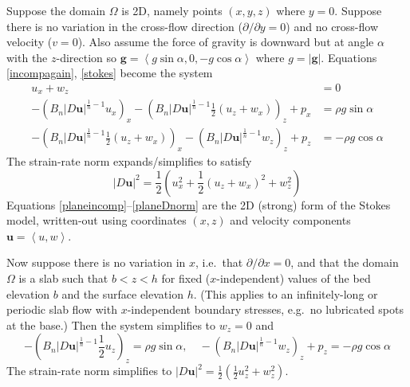 \documentclass[letterpaper,final,12pt,reqno]{amsart}
\newcommand{\bg}{\mathbf{g}}
\newcommand{\bu}{\mathbf{u}}
\begin{document}
Suppose the domain $\Omega$ is 2D, namely points $(x,y,z)$ where $y=0$.  Suppose there is no variation in the cross-flow direction ($\partial/\partial y=0$) and no cross-flow velocity ($v=0$).  Also assume the force of gravity is downward but at angle $\alpha$ with the $z$-direction so $\bg = \left<g\sin\alpha,0,-g\cos\alpha\right>$ where $g=|\bg|$.  Equations \eqref{incompagain}, \eqref{stokes} become the system
\begin{align}
u_x + w_z &= 0 \label{planeincomp} \\
- \left(B_n |D\bu|^{\frac{1}{n}-1} u_x\right)_x - \left(B_n |D\bu|^{\frac{1}{n}-1} \frac{1}{2} \left(u_z+w_x\right)\right)_z + p_x &= \rho g\sin\alpha \label{planestressx} \\
- \left(B_n |D\bu|^{\frac{1}{n}-1} \frac{1}{2} \left(u_z+w_x\right)\right)_x - \left(B_n |D\bu|^{\frac{1}{n}-1} w_z\right)_z + p_z &= -\rho g\cos\alpha \label{planestressz}
\end{align}
The strain-rate norm expands/simplifies to satisfy
\begin{equation}
    |D\bu|^2 = \frac{1}{2} \left(u_x^2 + \frac{1}{2}(u_z+w_x)^2 + w_z^2\right)  \label{planeDnorm}
\end{equation}
Equations \eqref{planeincomp}--\eqref{planeDnorm} are the 2D (strong) form of the Stokes model, written-out using coordinates $(x,z)$ and velocity components $\bu=\left<u,w\right>$.

Now suppose there is no variation in $x$, i.e.~that $\partial/\partial x=0$, and that the domain $\Omega$ is a slab such that $b < z < h$ for fixed ($x$-independent) values of the bed elevation $b$ and the surface elevation $h$.  (This applies to an infinitely-long or periodic slab flow with $x$-independent boundary stresses, e.g.~no lubricated spots at the base.)  Then the system simplifies to $w_z=0$ and
\begin{equation}
- \left(B_n |D\bu|^{\frac{1}{n}-1} \frac{1}{2} u_z\right)_z = \rho g\sin\alpha, \quad
- \left(B_n |D\bu|^{\frac{1}{n}-1} w_z\right)_z + p_z = -\rho g\cos\alpha \label{slabstresses}
\end{equation}
The strain-rate norm simplifies to $|D\bu|^2 = \frac{1}{2} \left(\frac{1}{2}u_z^2 + w_z^2\right)$.
\end{document}
